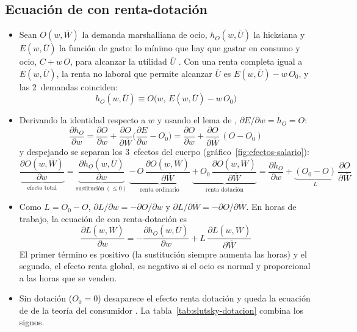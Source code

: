 \documentclass[11pt]{article}
\begin{document}
\subsection{Ecuación de  con renta-dotación}\label{anexo:slutsky-ecuacion}

\begin{itemize}
\item Sean $O(w,\overline{W})$ la demanda marshalliana de ocio, $h_O(w,\overline{U})$ la hicksiana y $E(w,\overline{U})$ la función de gasto: lo mínimo que hay que gastar en consumo y ocio, $C+w\,O$, para alcanzar la utilidad $\overline{U}$ . Con una renta completa igual a $E(w,\overline{U})$, la renta no laboral que permite alcanzar $\overline{U}$ es $E(w,\overline{U})-w\,O_0$, y las 2~demandas coinciden:
  \[
  h_O(w,\overline{U})\equiv O\big(w,\,E(w,\overline{U})-w\,O_0\big)
  \]
\item Derivando la identidad respecto a $w$ y usando el lema de , $\partial E/\partial w=h_O=O$:
  \[
  \frac{\partial h_O}{\partial w}=\frac{\partial O}{\partial w}+\frac{\partial O}{\partial\overline{W}}\Big(\frac{\partial E}{\partial w}-O_0\Big)=\frac{\partial O}{\partial w}+\frac{\partial O}{\partial\overline{W}}\,(O-O_0)
  \]
  y despejando se separan los 3~efectos del cuerpo (gráfico~\ref{fig:efectos-salario}):
  \begin{equation*}
  \underbrace{\frac{\partial O(w,\overline{W})}{\partial w}}_{\text{efecto total}}=\underbrace{\frac{\partial h_O(w,\overline{U})}{\partial w}}_{\text{sustitución}\ (\leq 0)}\ \underbrace{-\,O\,\frac{\partial O(w,\overline{W})}{\partial\overline{W}}}_{\text{renta ordinario}}\ \underbrace{+\,O_0\,\frac{\partial O(w,\overline{W})}{\partial\overline{W}}}_{\text{renta dotación}}=\frac{\partial h_O}{\partial w}+\underbrace{(O_0-O)}_{L}\,\frac{\partial O}{\partial\overline{W}}
  \end{equation*}
\item Como $L=O_0-O$, $\partial L/\partial w=-\partial O/\partial w$ y $\partial L/\partial\overline{W}=-\partial O/\partial\overline{W}$. En horas de trabajo, la ecuación de  con renta-dotación es
  \begin{equation}
  \frac{\partial L(w,\overline{W})}{\partial w}=-\frac{\partial h_O(w,\overline{U})}{\partial w}+L\,\frac{\partial L(w,\overline{W})}{\partial\overline{W}}\label{eq:slutsky-dotacion}
  \end{equation}
  El primer término es positivo (la sustitución siempre aumenta las horas) y el segundo, el efecto renta global, es negativo si el ocio es normal y proporcional a las horas que se venden.\findemo
\item Sin dotación ($O_0=0$) desaparece el efecto renta dotación y queda la ecuación de  de la teoría del consumidor . La tabla~\ref{tab:slutsky-dotacion} combina los signos.
\end{itemize}
\end{document}
